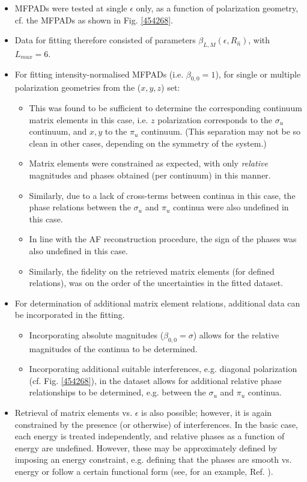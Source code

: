 \documentclass[10pt]{article}
\begin{document}
\begin{itemize}
\item MFPADs were tested at single $\epsilon$ only, as a function of polarization geometry, cf. the MFPADs as shown in Fig. \ref{454268}.
\item Data for fitting therefore consisted of parameters $\beta_{L,M}(\epsilon,R_{\hat{n}})$, with $L_{max}=6$.
\item For fitting intensity-normalised MFPADs (i.e. $\beta_{0,0}=1$), for single or multiple polarization geometries from the ($x,y,z$) set:
\begin{itemize}
\item This was found to be sufficient to determine the corresponding continuum matrix elements in this case, i.e. $z$ polarization corresponds to the $\sigma_u$ continuum, and $x,y$ to the $\pi_u$ continuum. (This separation may not be so clean in other cases, depending on the symmetry of the system.)
\item Matrix elements were constrained as expected, with only \textit{relative} magnitudes and phases obtained (per continuum) in this manner.
\item Similarly, due to a lack of cross-terms between continua in this case, the phase relations between the $\sigma_u$ and $\pi_u$ continua were also undefined in this case.
\item In line with the AF reconstruction procedure, the sign of the phases was also undefined in this case.
\item Similarly, the fidelity on the retrieved matrix elements (for defined relations), was on the order of the uncertainties in the fitted dataset.
\end{itemize}
\item For determination of additional matrix element relations, additional data can be incorporated in the fitting.
\begin{itemize}
\item Incorporating absolute magnitudes ($\beta_{0,0}=\sigma$) allows for the relative magnitudes of the continua to be determined.
\item Incorporating additional suitable interferences, e.g. diagonal polarization (cf. Fig. \ref{454268}), in the dataset allows for additional relative phase relationships to be determined, e.g. between the $\sigma_u$ and $\pi_u$ continua.
\end{itemize}
\item Retrieval of matrix elements vs. $\epsilon$ is also possible; however, it is again constrained by the presence (or otherwise) of interferences. In the basic case, each energy is treated independently, and relative phases as a function of energy are undefined. However, these may be approximately defined by imposing an energy constraint, e.g. defining that the phases are smooth vs. energy or follow a certain functional form (see, for an example, Ref. \cite{Yagishita2005}). %
\end{itemize}
\end{document}
